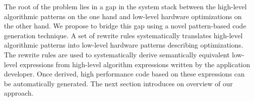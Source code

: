 \bigskip

The root of the problem lies in a gap in the system stack between the high-level algorithmic patterns on the one hand and low-level hardware optimizations on the other hand.
We propose to bridge this gap using a novel pattern-based code generation technique.
A set of rewrite rules systematically translates high-level algorithmic patterns into low-level hardware patterns describing optimizations.
The rewrite rules are used to systematically derive semantically equivalent low-level expressions from high-level algorithm expressions written by the application developer.
Once derived, high performance code based on these expressions can be automatically generated.
The next section introduces on overview of our approach.
 
